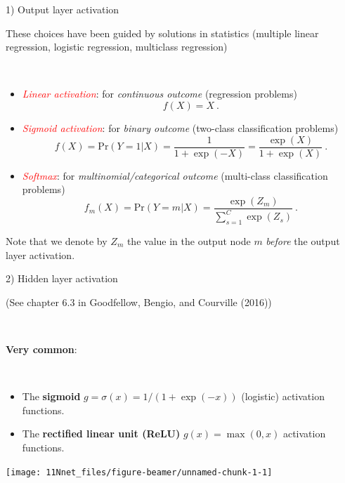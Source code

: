 \documentclass[
  10pt,
  ignorenonframetext,
  twocolumn]{beamer}
\providecommand{\tightlist}{%
  \setlength{\itemsep}{0pt}\setlength{\parskip}{0pt}}
\begin{document}
\begin{frame}
\begin{block}{1) Output layer activation}
\label{output-layer-activation}
\(~\)

These choices have been guided by solutions in statistics (multiple
linear regression, logistic regression, multiclass regression)

\(~\)

\begin{itemize}
\item
  \emph{\textcolor{red}{Linear activation}}: for \emph{continuous
  outcome} (regression problems) \[f(X)=X \ .\]
\item
  \emph{\textcolor{red}{Sigmoid activation}}: for \emph{binary outcome}
  (two-class classification problems)
  \[f(X)=\text{Pr}(Y=1 | X ) = \frac{1}{1+\exp(-X)} = \frac{\exp(X)}{1+\exp(X)} \ .\]
\item
  \emph{\textcolor{red}{Softmax}}: for \emph{multinomial/categorical
  outcome} (multi-class classification problems) \[
  f_m(X) =  \text{Pr}(Y=m | X ) = \frac{\exp(Z_m)}{\sum_{s=1}^{C}\exp(Z_s)} \ .
  \]
\end{itemize}

\scriptsize

Note that we denote by \(Z_m\) the value in the output node \(m\)
\emph{before} the output layer activation.
\end{block}
\end{frame}

\begin{frame}
\begin{block}{2) Hidden layer activation}
\label{hidden-layer-activation}
\tiny

(See chapter 6.3 in Goodfellow, Bengio, and Courville (2016))

\normalsize

\(~\)

\textbf{Very common}:

\(~\)

\begin{itemize}
\tightlist
\item
  The \textbf{sigmoid} \(g=\sigma(x)=1/(1+\exp(-x))\) (logistic)
  activation functions.
\item
  The \textbf{rectified linear unit (ReLU)} \(g(x)=\max(0,x)\)
  activation functions.
\end{itemize}

\vspace{2mm}

\centering

\texttt{[image: 11Nnet\_files/figure-beamer/unnamed-chunk-1-1]}
\end{block}
\end{frame}
\end{document}
